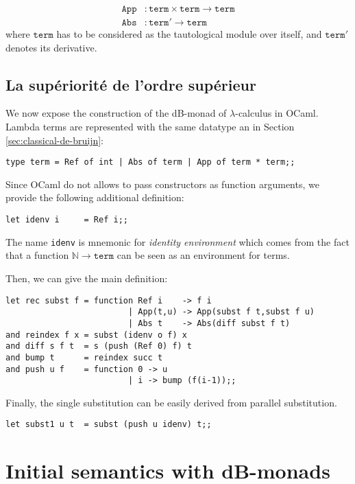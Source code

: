 \documentclass[a4paper,twoside,12pt]{article}
\theoremstyle{definition}
\theoremstyle{remark}
\theoremstyle{example}
\newcommand{\NN}{\mathbb{N}}
\begin{document}
\begin{align*}
  \mathtt{App} &\colon \mathtt{term} \times \mathtt{term} \to
                 \mathtt{term} \\
\mathtt{Abs} &\colon \mathtt{term}' \to \mathtt{term}
\end{align*}
where $\mathtt{term}$ has to be considered as the tautological module
over itself, and $\mathtt{term}'$ denotes its derivative.

\subsection{La supériorité de l'ordre supérieur}
\label{sec:super}

We now expose the construction of the dB-monad of $\lambda$-calculus
in OCaml.  Lambda terms are represented with the same datatype an in
Section \ref{sec:classical-de-bruijn}:
\begin{verbatim}
type term = Ref of int | Abs of term | App of term * term;;
\end{verbatim}

Since OCaml do not allows to pass constructors as function arguments,
we provide the following additional definition:
\begin{verbatim}
let idenv i     = Ref i;;
\end{verbatim}
The name \texttt{idenv} is mnemonic for \emph{identity environment}
which comes from the fact that a function $\NN \to \mathtt{term}$ can
be seen as an environment for terms.

Then, we can give the main definition:
\begin{verbatim}
let rec subst f = function Ref i    -> f i
                         | App(t,u) -> App(subst f t,subst f u)
                         | Abs t    -> Abs(diff subst f t)
and reindex f x = subst (idenv o f) x
and diff s f t  = s (push (Ref 0) f) t
and bump t      = reindex succ t
and push u f    = function 0 -> u
                         | i -> bump (f(i-1));;
\end{verbatim}

Finally, the single substitution can be easily derived from parallel substitution.
\begin{verbatim}
let subst1 u t  = subst (push u idenv) t;;
\end{verbatim}

\section{Initial semantics with dB-monads}
\label{sec:init-semantics}
\end{document}
